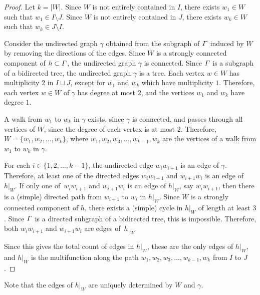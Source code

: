 \documentclass[11pt]{article}
\theoremstyle{definition}
\numberwithin{equation}{section}
\begin{document}
\begin{proof}
    Let \(k = |W|\).
    Since \(W\) is not entirely contained in \(I\),
    there exists \(w_1 \in W\) such that \(w_1 \in I \setminus J\).
    Since \(W\) is not entirely contained in \(J\),
    there exists \(w_k \in W\) such that \(w_k \in J \setminus I\).

    Consider the undirected graph \(\gamma\) obtained from the subgraph of \(\varGamma\) induced by \(W\) by removing the directions of the edges.
    Since \(W\) is a strongly connected component of \(h \subset \varGamma\),
    the undirected graph \(\gamma\) is connected.
    Since \(\varGamma\) is a subgraph of a bidirected tree,
    the undirected graph \(\gamma\) is a tree.
    Each vertex \(w \in W\) has multiplicity \(2\) in \(I \sqcup J\), except for \(w_1\) and \(w_k\) which have multiplicity \(1\).
    Therefore, each vertex \(w \in W\) of \(\gamma\) has degree at most \(2\), and the vertices \(w_1\) and \(w_k\) have degree \(1\).

    A walk from \(w_1\) to \(w_k\) in \(\gamma\) exists, since \(\gamma\) is connected, and passes through all vertices of \(W\), since the degree of each vertex is at most \(2\).
    Therefore, \(W = \{w_1, w_2, \dots, w_k\}\),
    where \(w_1, w_2, w_3, \dots, w_{k-1}, w_k\) are the vertices of a walk from \(w_1\) to \(w_k\) in \(\gamma\).

    For each \(i \in \{1, 2, \dots, k-1\}\), the undirected edge \(w_i w_{i+1}\) is an edge of \(\gamma\).
    Therefore, at least one of the directed edges \(w_i w_{i+1}\) and \(w_{i+1} w_i\) is an edge of \(h|_W\).
    If only one of~\(w_i w_{i+1}\) and \(w_{i+1} w_i\) is an edge of \(h|_W\), say \(w_i w_{i+1}\), then there is a (simple) directed path from \(w_{i+1}\) to \(w_i\) in \(h|_W\).
    Since \(W\) is a strongly connected component of \(h\), there exists a (simple) cycle in \(h|_W\) of length at least \(3\).
    Since \(\varGamma\) is a directed subgraph of a bidirected tree, this is impossible.
    Therefore, both \(w_i w_{i+1}\) and \(w_{i+1} w_i\) are edges of~\(h|_W\).

    Since this gives the total count of edges in \(h|_W\),
    these are the only edges of \(h|_W\), and \(h|_W\) is the multifunction along the path \(w_1, w_2, w_3, \dots, w_{k-1}, w_k\) from \(I\) to \(J\).
\end{proof}

Note that the edges of \(h|_W\) are uniquely determined by \(W\) and \(\gamma\).
\end{document}
